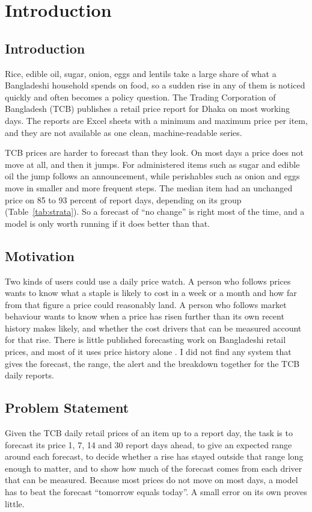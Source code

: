 \chapter{Introduction}

\section{Introduction}
Rice, edible oil, sugar, onion, eggs and lentils take a large share of what a Bangladeshi household spends on food, so a sudden rise in any of them is noticed quickly and often becomes a policy question. The Trading Corporation of Bangladesh (TCB) publishes a retail price report for Dhaka on most working days. The reports are Excel sheets with a minimum and maximum price per item, and they are not available as one clean, machine-readable series.

TCB prices are harder to forecast than they look. On most days a price does not move at all, and then it jumps. For administered items such as sugar and edible oil the jump follows an announcement, while perishables such as onion and eggs move in smaller and more frequent steps. The median item had an unchanged price on 85 to 93 percent of report days, depending on its group (Table~\ref{tab:strata}). So a forecast of ``no change'' is right most of the time, and a model is only worth running if it does better than that.

\section{Motivation}
Two kinds of users could use a daily price watch. A person who follows prices wants to know what a staple is likely to cost in a week or a month and how far from that figure a price could reasonably land. A person who follows market behaviour wants to know when a price has risen further than its own recent history makes likely, and whether the cost drivers that can be measured account for that rise. There is little published forecasting work on Bangladeshi retail prices, and most of it uses price history alone \cite{agripricebd}. I did not find any system that gives the forecast, the range, the alert and the breakdown together for the TCB daily reports.

\section{Problem Statement}
Given the TCB daily retail prices of an item up to a report day, the task is to forecast its price 1, 7, 14 and 30 report days ahead, to give an expected range around each forecast, to decide whether a rise has stayed outside that range long enough to matter, and to show how much of the forecast comes from each driver that can be measured. Because most prices do not move on most days, a model has to beat the forecast ``tomorrow equals today''. A small error on its own proves little.

